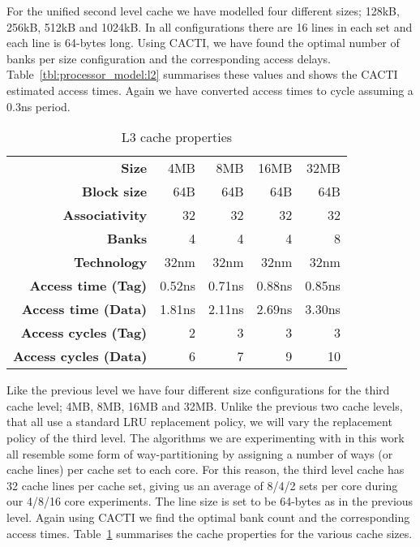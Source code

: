 For the unified second level cache we have modelled four different sizes; 128kB, 256kB, 512kB and 1024kB. 
In all configurations there are 16 lines in each set and each line is 64-bytes long.
Using CACTI, we have found the optimal number of banks per size configuration and the corresponding access delays.
Table~\ref{tbl:processor_model:l2} summarises these values and shows the CACTI estimated access times. 
Again we have converted access times to cycle assuming a 0.3ns period.

\begin{table}[ht]
\centering
\begin{tabular}{rrrrr}
\toprule
\bf{Size}                 & 4MB         & 8MB         & 16MB        & 32MB              \\
\bf{Block size}           & 64B         & 64B         & 64B         & 64B               \\
\bf{Associativity}        & 32          & 32          & 32          & 32                \\
\bf{Banks}                & 4           & 4           & 4           & 8                 \\
\bf{Technology}           & 32nm        & 32nm        & 32nm        & 32nm              \\
\bf{Access time (Tag)}    & 0.52ns      & 0.71ns      & 0.88ns      & 0.85ns            \\
\bf{Access time (Data)}   & 1.81ns      & 2.11ns      & 2.69ns      & 3.30ns            \\
\bf{Access cycles (Tag)}  & 2           & 3           & 3           & 3                 \\
\bf{Access cycles (Data)} & 6           & 7           & 9           & 10                \\
\bottomrule
\end{tabular}
\caption{L3 cache properties}
\label{tbl:processor_model:l3}
\end{table}

Like the previous level we have four different size configurations for the third cache level; 4MB, 8MB, 16MB and 32MB.
Unlike the previous two cache levels, that all use a standard LRU replacement policy, we will vary the replacement policy of the third level.
The algorithms we are experimenting with in this work all resemble some form of way-partitioning by assigning a number of ways (or cache lines) per cache set to each core.
For this reason, the third level cache has 32 cache lines per cache set, giving us an average of 8/4/2 sets per core during our 4/8/16 core experiments.
The line size is set to be 64-bytes as in the previous level.
Again using CACTI we find the optimal bank count and the corresponding access times.
Table~\ref{tbl:processor_model:l3} summarises the cache properties for the various cache sizes.





